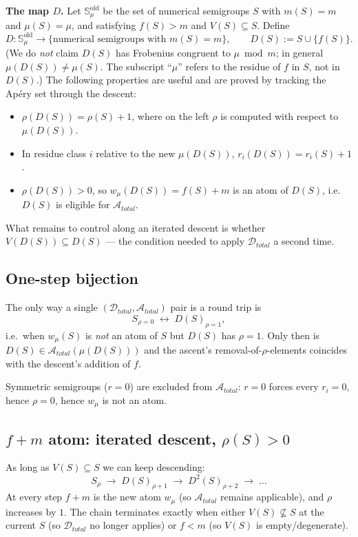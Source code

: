 \documentclass[11pt, a4paper]{article}
\begin{document}
\textbf{The map $D$.} Let $\mathbb{S}_\mu^{\mathrm{old}}$ be the set
of numerical semigroups $S$ with $m(S) = m$ and $\mu(S) = \mu$, and
satisfying $f(S) > m$ and $V(S) \subseteq S$. Define
\[
   D : \mathbb{S}_\mu^{\mathrm{old}} \longrightarrow
   \{\text{numerical semigroups with } m(S) = m\},
   \qquad D(S) := S \cup \{f(S)\}.
\]
(We do \emph{not} claim $D(S)$ has Frobenius congruent to $\mu \bmod m$;
in general $\mu(D(S)) \neq \mu(S)$. The subscript ``$\mu$'' refers
to the residue of $f$ in $S$, not in $D(S)$.) The following
properties are useful and are proved by tracking the Apéry set
through the descent:
\begin{itemize}
   \item $\rho(D(S)) = \rho(S) + 1$, where on the left $\rho$ is
   computed with respect to $\mu(D(S))$.
   \item In residue class $i$ relative to the new $\mu(D(S))$,
   $r_i(D(S)) = r_i(S) + 1$.
   \item $\rho(D(S)) > 0$, so $w_\mu(D(S)) = f(S) + m$ is an atom
   of $D(S)$, i.e.\ $D(S)$ is eligible for $\mathcal{A}_{total}$.
\end{itemize}
What remains to control along an iterated descent is whether
$V(D(S)) \subseteq D(S)$ --- the condition needed to apply
$\mathcal{D}_{total}$ a second time.

\subsection{One-step bijection}
The only way a single $(\mathcal{D}_{total}, \mathcal{A}_{total})$
pair is a round trip is
\[
   S_{\rho = 0}\;\longleftrightarrow\;D(S)_{\rho = 1},
\]
i.e.\ when $w_\mu(S)$ is \emph{not} an atom of $S$ but $D(S)$ has
$\rho = 1$. Only then is $D(S) \in \mathcal{A}_{total}(\mu(D(S)))$
and the ascent's removal-of-$\rho$-elements coincides with the
descent's addition of $f$.

Symmetric semigroups ($r = 0$) are excluded from
$\mathcal{A}_{total}$: $r = 0$ forces every $r_i = 0$, hence
$\rho = 0$, hence $w_\mu$ is not an atom.

\subsection{$f+m$ atom: iterated descent, $\rho(S) > 0$}
As long as $V(S) \subseteq S$ we can keep descending:
\[
   S_\rho \;\to\; D(S)_{\rho+1} \;\to\; D^2(S)_{\rho+2} \;\to\; \dots
\]
At every step $f + m$ is the new atom $w_\mu$ (so $\mathcal{A}_{total}$
remains applicable), and $\rho$ increases by $1$. The chain
terminates exactly when either $V(S) \not\subseteq S$ at the
current $S$ (so $\mathcal{D}_{total}$ no longer applies) or
$f < m$ (so $V(S)$ is empty/degenerate).
\end{document}
